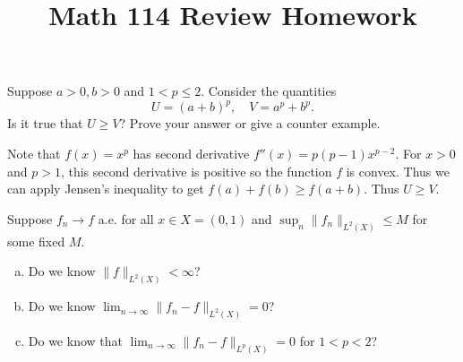 \documentclass[11pt,letterpaper]{article}
\title{\textbf{Math 114 Review Homework}}
\begin{document}
\maketitle

\begin{problem}
    Suppose $a > 0, b > 0$ and $1 < p \leq 2$. Consider the quantities
    \[
        U = (a+b)^p,\quad V = a^p+b^p
    .\]
    Is it true that $U\geq V$? Prove your answer or give a counter example. 
\end{problem}

\begin{solution}
    \quad Note that $f(x)=x^p$ has second derivative $f''(x)=p(p-1)x^{p-2}$. For $x>0$ and $p>1$, this second derivative is positive so the function $f$ is convex. Thus we can apply Jensen's inequality to get $f(a)+f(b)\geq f(a+b)$. Thus $U \geq V$.
\end{solution}

\begin{problem}
    Suppose $f_n \to f$ a.e. for all $x\in X = (0,1)$ and $\sup_n \|f_n\|_{L^2(X)} \leq M$ for some fixed $M$.
    \begin{enumerate}[(a)]
        \item Do we know $\|f\|_{L^2(X)}<\infty$?
        \item Do we know $\lim_{n\to \infty} \|f_n-f\|_{L^2(X)} = 0$?
        \item Do we know that $\lim_{n\to \infty} \|f_n-f\|_{L^p(X)}=0$ for $1 < p < 2$? 
    \end{enumerate}
\end{problem}
\end{document}
